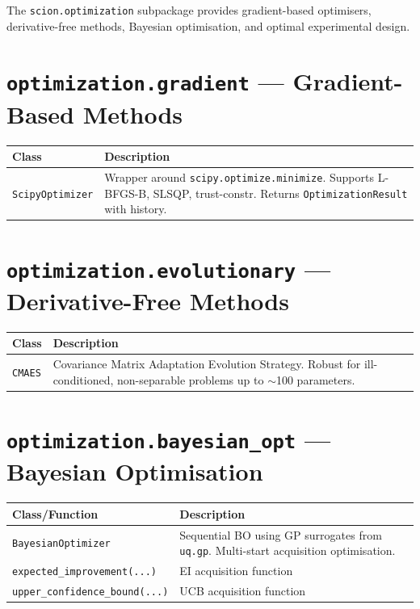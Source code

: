 \documentclass[11pt,a4paper]{report}
\begin{document}
The \texttt{scion.optimization} subpackage provides gradient-based optimisers, derivative-free methods, Bayesian optimisation, and optimal experimental design.

\section{\texttt{optimization.gradient} --- Gradient-Based Methods}

\begin{longtable}{lp{8cm}}
\toprule
\textbf{Class} & \textbf{Description} \\
\midrule
\texttt{ScipyOptimizer} & Wrapper around \texttt{scipy.optimize.minimize}. Supports L-BFGS-B, SLSQP, trust-constr. Returns \texttt{OptimizationResult} with history. \\
\bottomrule
\end{longtable}

\section{\texttt{optimization.evolutionary} --- Derivative-Free Methods}

\begin{longtable}{lp{8cm}}
\toprule
\textbf{Class} & \textbf{Description} \\
\midrule
\texttt{CMAES} & Covariance Matrix Adaptation Evolution Strategy. Robust for ill-conditioned, non-separable problems up to $\sim$100 parameters. \\
\bottomrule
\end{longtable}

\section{\texttt{optimization.bayesian\_opt} --- Bayesian Optimisation}

\begin{longtable}{lp{8cm}}
\toprule
\textbf{Class/Function} & \textbf{Description} \\
\midrule
\texttt{BayesianOptimizer} & Sequential BO using GP surrogates from \texttt{uq.gp}. Multi-start acquisition optimisation. \\
\texttt{expected\_improvement(...)} & EI acquisition function \\
\texttt{upper\_confidence\_bound(...)} & UCB acquisition function \\
\bottomrule
\end{longtable}
\end{document}
